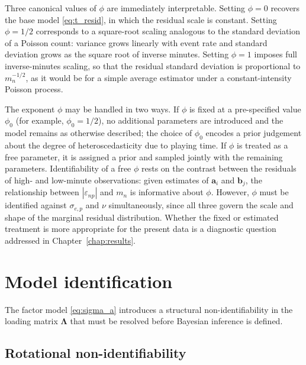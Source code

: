 Three canonical values of $\phi$ are immediately interpretable. Setting $\phi = 0$ recovers the base model \eqref{eq:t_resid}, in which the residual scale is constant. Setting $\phi = 1/2$ corresponds to a square-root scaling analogous to the standard deviation of a Poisson count: variance grows linearly with event rate and standard deviation grows as the square root of inverse minutes. Setting $\phi = 1$ imposes full inverse-minutes scaling, so that the residual standard deviation is proportional to $m_n^{-1/2}$, as it would be for a simple average estimator under a constant-intensity Poisson process.

\begin{remark}
\label{rem:phi}
The exponent $\phi$ may be handled in two ways. If $\phi$ is fixed at a pre-specified value $\phi_0$ (for example, $\phi_0 = 1/2$), no additional parameters are introduced and the model remains as otherwise described; the choice of $\phi_0$ encodes a prior judgement about the degree of heteroscedasticity due to playing time. If $\phi$ is treated as a free parameter, it is assigned a prior and sampled jointly with the remaining parameters. Identifiability of a free $\phi$ rests on the contrast between the residuals of high- and low-minute observations: given estimates of $\mathbf{a}_i$ and $\mathbf{b}_j$, the relationship between $|\varepsilon_{np}|$ and $m_n$ is informative about $\phi$. However, $\phi$ must be identified against $\sigma_{e,p}$ and $\nu$ simultaneously, since all three govern the scale and shape of the marginal residual distribution. Whether the fixed or estimated treatment is more appropriate for the present data is a diagnostic question addressed in Chapter~\ref{chap:results}.
\end{remark}

\section{Model identification}
\label{sec:identification}

The factor model \eqref{eq:sigma_a} introduces a structural non-identifiability in the loading matrix $\boldsymbol{\Lambda}$ that must be resolved before Bayesian inference is defined.

\subsection{Rotational non-identifiability}

